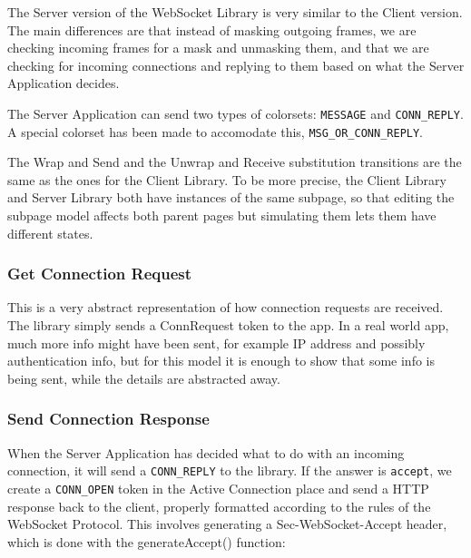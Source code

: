 	
	The Server version of the WebSocket Library is very similar to the Client
	version. The main differences are that instead of masking outgoing frames, we
	are checking incoming frames for a mask and unmasking them, and that we are
	checking for incoming connections and replying to them based on what the Server
	Application decides.
	
	The Server Application can send two types of colorsets: \lstinline:MESSAGE: and
	\lstinline:CONN_REPLY:. A special colorset has been made to accomodate this,
	\lstinline:MSG_OR_CONN_REPLY:. 
	
	The Wrap and Send and the Unwrap and Receive substitution transitions are the
	same as the ones for the Client Library. To be more precise, the Client Library
	and Server Library both have instances of the same subpage, so that editing the
	subpage model affects both parent pages but simulating them lets them have
	different states.
	
	\subsubsection{Get Connection Request}
		
		
		This is a very abstract representation of how connection requests are
		received. The library simply sends a ConnRequest token to the app. In a real
		world app, much more info might have been sent, for example IP address and
		possibly authentication info, but for this model it is enough to show that
		some info is being sent, while the details are abstracted away. 

	\subsubsection{Send Connection Response}
		
		
		When the Server Application has decided what to do with an incoming
		connection, it will send a \lstinline:CONN_REPLY: to the library. If the
		answer is \lstinline:accept:, we create a \lstinline:CONN_OPEN: token in the
		Active Connection place and send a HTTP response back to the client, properly
		formatted according to the rules of the WebSocket Protocol. This involves
		generating a Sec-WebSocket-Accept header, which is done with the
		generateAccept() function:
		
